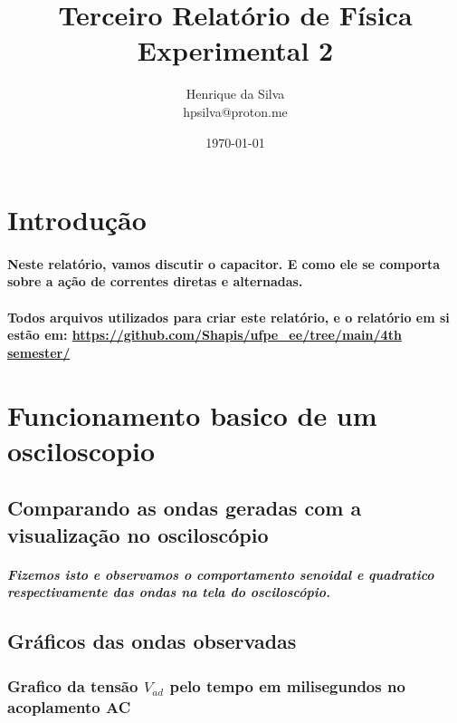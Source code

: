 \documentclass[12pt,twoside, a4paper, twocolumn]{article}
\title{Terceiro Relatório de Física Experimental 2}
\author{Henrique da Silva \\ hpsilva@proton.me}
\date{\today}
\begin{document}
\maketitle
{}
\newpage
\tableofcontents
\newpage

\section{Introdução}

\paragraph*{Neste relatório, vamos discutir o capacitor. E como ele se comporta sobre a ação de correntes diretas e alternadas.}

\paragraph*{Todos arquivos utilizados para criar este relatório, e o relatório em si estão em:  \url{https://github.com/Shapis/ufpe_ee/tree/main/4th semester/}}


\section{Funcionamento basico de um osciloscopio}

\subsection{Comparando as ondas geradas com a visualização no osciloscópio}

\subparagraph*{Fizemos isto e observamos o comportamento senoidal e quadratico respectivamente das ondas na tela do osciloscópio.}

\subsection{Gráficos das ondas observadas}

\subsubsection{Grafico da tensão $V_{ad}$ pelo tempo em milisegundos no acoplamento AC}

\end{document}
